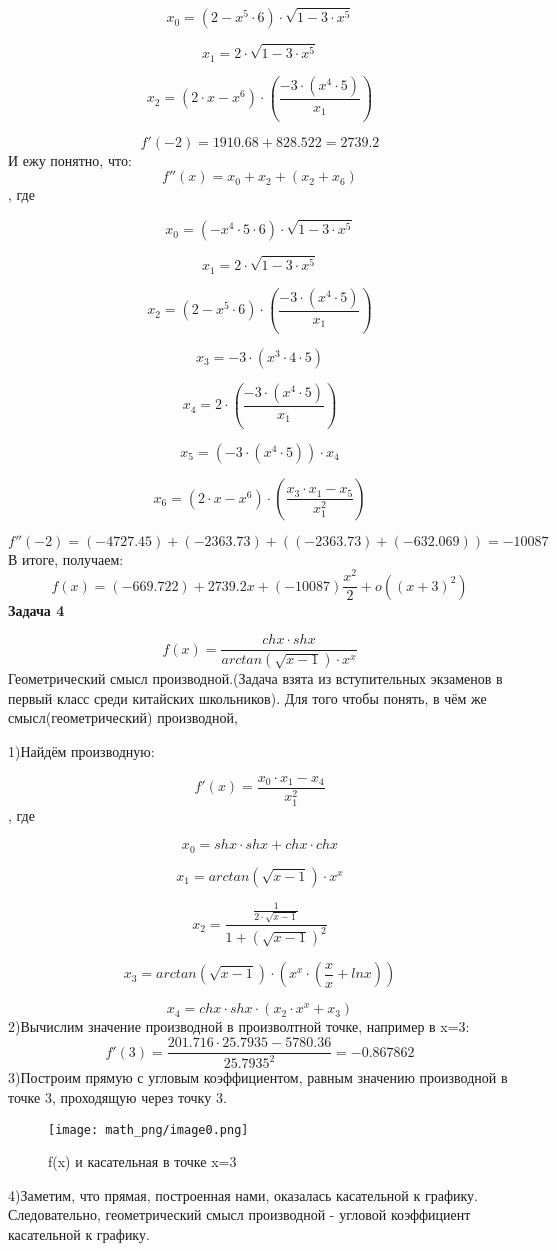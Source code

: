 \documentclass[12pt,a4paper,fleqn]{article}
\begin{document}
$$
x_{0} = \left(2- x^{5}\cdot6\right)\cdot\sqrt{1-3\cdot x^{5}}
$$

$$
x_{1} = 2\cdot\sqrt{1-3\cdot x^{5}}
$$

$$
x_{2} = \left(2\cdot x- x^{6}\right)\cdot\left(\frac{-3\cdot\left( x^{4}\cdot5\right)}{ x_{1}}\right)
$$

$$
f'(-2)=1910.68+828.522=2739.2
$$
И ежу понятно, что:
$$
f''(x)= x_{0}+ x_{2}+\left( x_{2}+ x_{6}\right)
$$
, где

$$
x_{0} = \left(- x^{4}\cdot5\cdot6\right)\cdot\sqrt{1-3\cdot x^{5}}
$$

$$
x_{1} = 2\cdot\sqrt{1-3\cdot x^{5}}
$$

$$
x_{2} = \left(2- x^{5}\cdot6\right)\cdot\left(\frac{-3\cdot\left( x^{4}\cdot5\right)}{ x_{1}}\right)
$$

$$
x_{3} = -3\cdot\left( x^{3}\cdot4\cdot5\right)
$$

$$
x_{4} = 2\cdot\left(\frac{-3\cdot\left( x^{4}\cdot5\right)}{ x_{1}}\right)
$$

$$
x_{5} = \left(-3\cdot\left( x^{4}\cdot5\right)\right)\cdot x_{4}
$$

$$
x_{6} = \left(2\cdot x- x^{6}\right)\cdot\left(\frac{ x_{3}\cdot x_{1}- x_{5}}{ x_{1}^{2}}\right)
$$

$$
f''(-2)=(-4727.45)+(-2363.73)+\left((-2363.73)+(-632.069)\right)=-10087
$$
В итоге, получаем:
$$
f(x)=(-669.722)+2739.2x+(-10087)\frac{x^2}{2}+o((x+3)^{2})
$$
{\bf \Large
Задача 4
}

$$
f(x)=\frac{ ch x\cdot sh x}{ arctan\left(\sqrt{ x-1}\right)\cdot x^{ x}}
$$
Геометрический смысл производной.(Задача взята из вступительных экзаменов в первый класс среди китайских школьников). Для того чтобы понять, в чём же смысл(геометрический) производной,

1)Найдём производную:

$$
f'(x)=\frac{ x_{0}\cdot x_{1}- x_{4}}{ x_{1}^{2}}
$$
, где

$$
x_{0} =  sh x\cdot sh x+ ch x\cdot ch x
$$

$$
x_{1} =  arctan\left(\sqrt{ x-1}\right)\cdot x^{ x}
$$

$$
x_{2} = \frac{\frac{1}{2\cdot\sqrt{ x-1}}}{1+\left(\sqrt{ x-1}\right)^{2}}
$$

$$
x_{3} =  arctan\left(\sqrt{ x-1}\right)\cdot\left( x^{ x}\cdot\left(\frac{ x}{ x}+ ln x\right)\right)
$$

$$
x_{4} =  ch x\cdot sh x\cdot\left( x_{2}\cdot x^{ x}+ x_{3}\right)
$$
2)Вычислим значение производной в произволтной точке, например в x=3:
$$
f'(3)=\frac{201.716\cdot25.7935-5780.36}{25.7935^{2}}=-0.867862
$$
3)Построим прямую с угловым коэффициентом, равным значению производной в точке 3, проходящую через точку 3.

\begin{figure}[h]
\texttt{[image: math\_png/image0.png]}
\caption{f(x) и касательная в точке x=3}
\end{figure}4)Заметим, что прямая, построенная нами, оказалась касательной к графику. Следовательно, геометрический смысл производной - угловой коэффициент касательной к графику.
\end{document}
